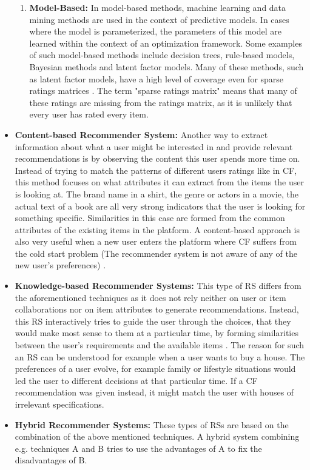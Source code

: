 \begin{itemize}
\begin{enumerate}
    	\item \textbf{Model-Based:} In model-based methods, machine learning
    	and data mining methods are used in the context of predictive models.
        In cases where the model is parameterized, the parameters of this
        model are learned within the context of an optimization framework.
        Some examples of such model-based methods include decision trees,
        rule-based models, Bayesian methods and latent factor models.
        Many of these methods, such as latent factor models, have a high
        level of coverage even for sparse ratings matrices \citep{Aggarwal}.
        The term "sparse ratings matrix" means that many of these ratings are missing
        from the ratings matrix,
        as it is unlikely that every user has rated every item.
	\end{enumerate}
	\item \textbf{Content-based Recommender System:} Another way to extract
    information about what a user might be interested in and provide
    relevant recommendations is by observing the content this user spends more
    time on. Instead of trying to match the patterns of different users ratings
    like in CF, this method focuses on what attributes
    it can extract from the items the user is looking at. The brand name in
    a shirt, the genre or actors in a movie, the actual text of a book are
    all very strong indicators that the user is looking for something
    specific. Similarities in this case are formed from the common attributes
    of the existing items in the platform. A content-based approach is
    also very useful when a new user enters the platform where CF suffers
    from the cold start problem (The recommender system is not aware of
    any of the new user's preferences) \citep{Aggarwal}.
	\item \textbf{Knowledge-based Recommender Systems:} This type of RS differs from
    the aforementioned techniques as it does not rely neither on user or item
    collaborations nor on item attributes to generate recommendations. Instead,
    this RS interactively tries to guide the user through the choices, that they would
    make most sense to them at a particular time, by forming similarities between the
    user's requirements and the available items \citep{Jannach}. The reason for such an RS can be
    understood for example when a user wants to buy a house. The preferences of a user evolve,
    for example family or lifestyle situations would led the user to different decisions at
    that particular time. If a CF recommendation was given instead, it might match the user
    with houses of irrelevant specifications.
	\item \textbf{Hybrid Recommender Systems:} These types of RSs are based on the
    combination of the above mentioned techniques. A hybrid system combining e.g.
    techniques A and B tries to use the advantages of A to fix the
    disadvantages of B. \citep{Ricci}
\end{itemize}

